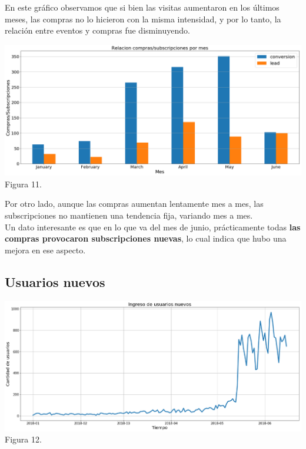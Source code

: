 \documentclass[a4paper ,12pt]{article}
\begin{document}
En este gráfico observamos que si bien las visitas aumentaron en los últimos meses, las compras no lo hicieron con la misma intensidad, y por lo tanto, la relación entre eventos y compras fue disminuyendo.\\

\begin{center}
	\includegraphics[width=1.1\linewidth]{output_41_0}
	Figura 11.
	
\end{center}

Por otro lado, aunque las compras aumentan lentamente mes a mes, las subscripciones no mantienen una tendencia fija, variando mes a mes. \\

Un dato interesante es que en lo que va del mes de junio, prácticamente todas \textbf{las compras provocaron subscripciones nuevas}, lo cual indica que hubo una mejora en ese aspecto.

\subsection{Usuarios nuevos}

\begin{center}
	\includegraphics[width=1.1\linewidth]{output_44_0}
	Figura 12.
	
\end{center}
\end{document}
